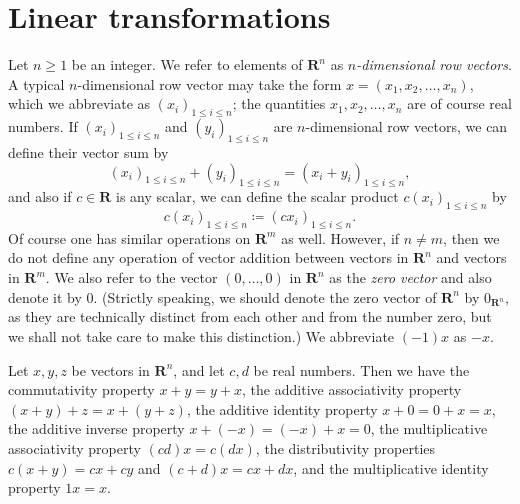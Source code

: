 \section{Linear transformations}\label{sec 6.1}

\begin{definition}\label{6.1.1}
    Let \(n \geq 1\) be an integer.
    We refer to elements of \(\mathbf{R}^n\) as \emph{\(n\)-dimensional row vectors}.
    A typical \(n\)-dimensional row vector may take the form \(x = (x_1, x_2, \dots, x_n)\), which we abbreviate as \((x_i)_{1 \leq i \leq n}\);
    the quantities \(x_1, x_2, \dots, x_n\) are of course real numbers.
    If \((x_i)_{1 \leq i \leq n}\) and \((y_i)_{1 \leq i \leq n}\) are \(n\)-dimensional row vectors, we can define their vector sum by
    \[
        (x_i)_{1 \leq i \leq n} + (y_i)_{1 \leq i \leq n} = (x_i + y_i)_{1 \leq i \leq n},
    \]
    and also if \(c \in \mathbf{R}\) is any scalar, we can define the scalar product \(c (x_i)_{1 \leq i \leq n}\) by
    \[
        c (x_i)_{1 \leq i \leq n} \coloneqq (cx_i)_{1 \leq i \leq n}.
    \]
    Of course one has similar operations on \(\mathbf{R}^m\) as well.
    However, if \(n \neq m\), then we do not define any operation of vector addition between vectors in \(\mathbf{R}^n\) and vectors in \(\mathbf{R}^m\).
    We also refer to the vector \((0, \dots, 0)\) in \(\mathbf{R}^n\) as the \emph{zero vector} and also denote it by \(0\).
    (Strictly speaking, we should denote the zero vector of \(\mathbf{R}^n\) by \(0_{\mathbf{R}^n}\), as they are technically distinct from each other and from the number zero, but we shall not take care to make this distinction.)
    We abbreviate \((-1) x\) as \(-x\).
\end{definition}

\begin{lemma}\label{6.1.2}
    Let \(x, y, z\) be vectors in \(\mathbf{R}^n\), and let \(c, d\) be real numbers.
    Then we have the commutativity property \(x + y = y + x\), the additive associativity property \((x + y) + z = x + (y + z)\), the additive identity property \(x + 0 = 0 + x = x\), the additive inverse property \(x + (-x) = (-x) + x = 0\), the multiplicative associativity property \((cd)x = c(dx)\), the distributivity properties \(c(x + y) = cx + cy\) and \((c + d)x = cx + dx\), and the multiplicative identity property \(1x = x\).
\end{lemma}

